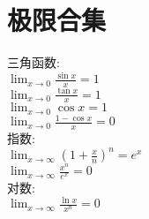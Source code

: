\chapter{极限合集}
三角函数:\\
$\displaystyle\lim_{x\to 0}\frac{\sin x}{x}=1$\\
$\displaystyle\lim_{x\to 0}\frac{\tan x}{x}=1$\\
$\displaystyle\lim_{x\to 0}\cos x=1$\\
$\displaystyle\lim_{x\to 0}\frac{1-\cos x}{x}=0$\\

指数:\\
$\displaystyle\lim_{x\to\infty}(1+\frac{x}{n})^n=e^x$\\
$\displaystyle\lim_{x\to\infty}\frac{x^n}{e^x}=0$\\

对数:\\
$\displaystyle\lim_{x\to\infty}\frac{\ln x}{x^n}=0$
